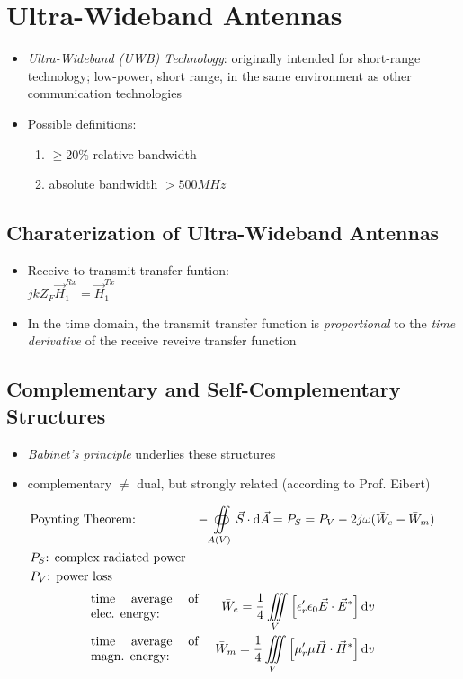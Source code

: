 \section{Ultra-Wideband Antennas}
\begin{itemize}
    \itemsep0pt
    \item \textit{Ultra-Wideband (UWB) Technology}: originally intended for short-range technology; low-power, short range, in the same environment as other communication technologies
    \item Possible definitions:
        \begin{enumerate}
            \item $\geq 20\%$ relative bandwidth
            \item absolute bandwidth $> 500\si{MHz}$
        \end{enumerate}
\end{itemize}

\subsection{Charaterization of Ultra-Wideband Antennas}
\begin{itemize}
    \itemsep0pt
    \item Receive to transmit transfer funtion:\\
        \(jkZ_F \vec{H}^{Rx}_1 = \vec{H}^{Tx}_1\)
    \item In the time domain, the transmit transfer function is \textit{proportional} to the \textit{time derivative} of the receive reveive transfer function
\end{itemize}

\subsection{Complementary and Self-Complementary Structures}
\begin{itemize}
    \itemsep0pt
    \item \textit{Babinet's principle} underlies these structures
    \item complementary $\neq$ dual, but strongly related (according to Prof. Eibert)
\end{itemize}
\begin{align*}
    &\parbox{3cm}{Poynting Theorem: }\
    &-\oiint\limits_{A(V)}\vec{S}\cdot\mathrm{d}\vec{A} = P_S = P_V - 2j\omega(\bar{W}_e - \bar{W}_m)\\
    &P_S\text{: complex radiated power}\\
    &P_V\text{: power loss}\\
\end{align*}
\begin{align*}
    &\parbox{3cm}{time average of elec. energy: }\
    &\bar{W}_e = \dfrac{1}{4} \iiint\limits_V \left[\epsilon^\prime_r \epsilon_0 \vec{E}\cdot\vec{E}^*\right]\mathrm{d}v\\
    &\parbox{3cm}{time average of magn. energy: }\
    &\bar{W}_m = \dfrac{1}{4} \iiint\limits_V \left[\mu^\prime_r \mu \vec{H}\cdot\vec{H}^*\right]\mathrm{d}v\\\\
\end{align*}

